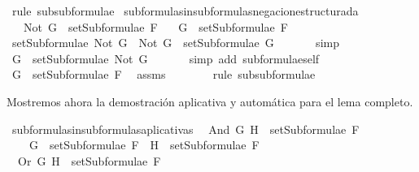 \begin{isabellebody}
\ {\isacharparenleft}rule\ subsubformulae{\isacharparenright}\isanewline
{}\isamarkupfalse%
%
\endisatagproof
{\isafoldproof}%
%
\isadelimproof
\isanewline
%
\endisadelimproof
\isanewline
{}\isamarkupfalse%
\ subformulas{\isacharunderscore}in{\isacharunderscore}subformulas{\isacharunderscore}negacion{\isacharunderscore}estructurada{\isacharcolon}\isanewline
\ \ \ {\isachardoublequoteopen}Not\ G\ {\isasymin}\ setSubformulae\ F{\isachardoublequoteclose}\isanewline
\ \ \ {\isachardoublequoteopen}G\ {\isasymin}\ setSubformulae\ F{\isachardoublequoteclose}\isanewline
%
\isadelimproof
%
\endisadelimproof
%
\isatagproof
{}\isamarkupfalse%
\ {\isacharminus}\isanewline
\ \ \isamarkupfalse%
\ {\isachardoublequoteopen}setSubformulae\ {\isacharparenleft}Not\ G{\isacharparenright}\ {\isacharequal}\ {\isacharbraceleft}Not\ G{\isacharbraceright}\ {\isasymunion}\ setSubformulae\ G{\isachardoublequoteclose}\ \isanewline
\ \ \ \ \isamarkupfalse%
\ simp\ %
\isanewline
\ \ \isamarkupfalse%
\ \isamarkupfalse%
\ {}{\isacharcolon}{\isachardoublequoteopen}G\ {\isasymin}\ setSubformulae\ {\isacharparenleft}Not\ G{\isacharparenright}{\isachardoublequoteclose}\ \isanewline
\ \ \ \ \isamarkupfalse%
\ {\isacharparenleft}simp\ add{\isacharcolon}\ subformulae{\isacharunderscore}self{\isacharparenright}\ %
\isanewline
\ \ \isamarkupfalse%
\ {\isachardoublequoteopen}G\ {\isasymin}\ setSubformulae\ F{\isachardoublequoteclose}\ \isamarkupfalse%
\ assms\ {}\ \isanewline
\ \ \ \ \isamarkupfalse%
\ {\isacharparenleft}rule\ subsubformulae{\isacharparenright}\isanewline
{}\isamarkupfalse%
%
\endisatagproof
{\isafoldproof}%
%
\isadelimproof
%
\endisadelimproof
%
\begin{isamarkuptext}%
Mostremos ahora la demostración aplicativa y automática para el 
  lema completo.%
\end{isamarkuptext}\isamarkuptrue%
\isamarkupfalse%
\ subformulas{\isacharunderscore}in{\isacharunderscore}subformulas{\isacharunderscore}aplicativa{\isacharunderscore}s{\isacharcolon}\isanewline
\ \ {\isachardoublequoteopen}And\ G\ H\ {\isasymin}\ setSubformulae\ F\ \isanewline
\ \ \ {\isasymLongrightarrow}\ G\ {\isasymin}\ setSubformulae\ F\ {\isasymand}\ H\ {\isasymin}\ setSubformulae\ F{\isachardoublequoteclose}\isanewline
\ \ {\isachardoublequoteopen}Or\ G\ H\ {\isasymin}\ setSubformulae\ F\ \isanewline

\end{isabellebody}
